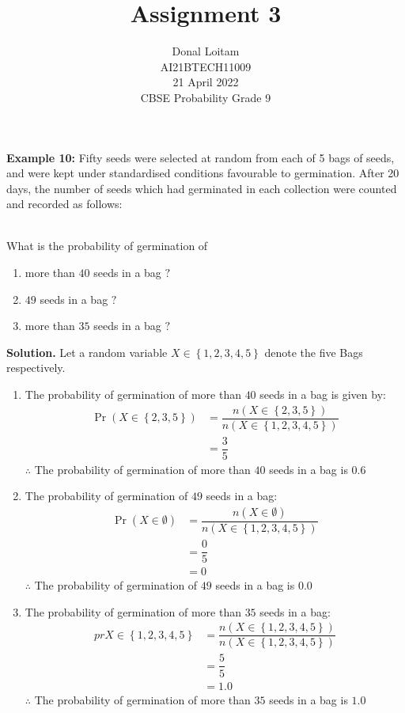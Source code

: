\documentclass[journal,12pt,twocolumn]{IEEEtran}
\title{Assignment 3}
\author{Donal Loitam \\ \normalsize AI21BTECH11009 \\ \vspace*{20pt} \normalsize  21 April 2022 \\ \vspace*{20pt} \Large CBSE Probability Grade 9}
\providecommand{\cbrak}[1]{\ensuremath{\left\{#1\right\}}}
\providecommand{\pr}[1]{\ensuremath{\Pr\left(#1\right)}}
\begin{document}
	\maketitle
	
	\textbf{Example 10:}
	 Fifty seeds were selected at random from each of 5 bags of seeds, and
were kept under standardised conditions favourable to germination. After 20 days, the number of seeds which had germinated in each collection were counted and recorded as follows:\\
\begin{table}[ht!]
\begin{center}
		
		\vspace*{5pt}
		\caption{}
		\label{table:table1}
\end{center}	
	\end{table}\\
What is the probability of germination of
\begin{enumerate}[label=(\roman*)]
    \item more than $40$ seeds in a bag $?$
 	\item $49$ seeds in a bag $?$
 	\item more than $35$ seeds in a bag $?$
    \end{enumerate}
    
	\textbf{Solution.}
     Let a random variable $X \in \cbrak{1,2,3,4,5}$ denote the five Bags respectively. 
	\begin{enumerate}[label=(\roman*)]
    \item The probability of germination of more than $40$ seeds in a bag is given by:
	\begin{align}
	\pr{X \in \cbrak{2,3,5}} &= \dfrac{n(X \in \cbrak{2,3,5})}{n(X \in \cbrak{1,2,3,4,5})} \\
	&= \dfrac{3}{5}
	\end{align}
	$\therefore$ The probability of germination of more than $40$ seeds in a bag is $0.6$
	
	\item The probability of germination of $49$ seeds in a bag:
	\begin{align}
	\pr{X \in \emptyset} &= \dfrac{n(X \in \emptyset)}{n(X \in \cbrak{1,2,3,4,5})} \\
	&= \dfrac{0}{5}\\
	&= 0
	\end{align}
	$\therefore$ The probability of germination of $49$ seeds in a bag is $0.0$
	
	\item The probability of germination of more than $35$ seeds in a bag:
	\begin{align}
     pr{X \in \cbrak{1,2,3,4,5}} &= \dfrac{n(X \in \cbrak{1,2,3,4,5})}{n(X \in \cbrak{1,2,3,4,5})} \\
	&= \dfrac{5}{5}\\
	&= 1.0
	\end{align}
	$\therefore$ The probability of germination of more than $35$ seeds in a bag is $1.0$
	
	\end{enumerate}
	
\end{document}
